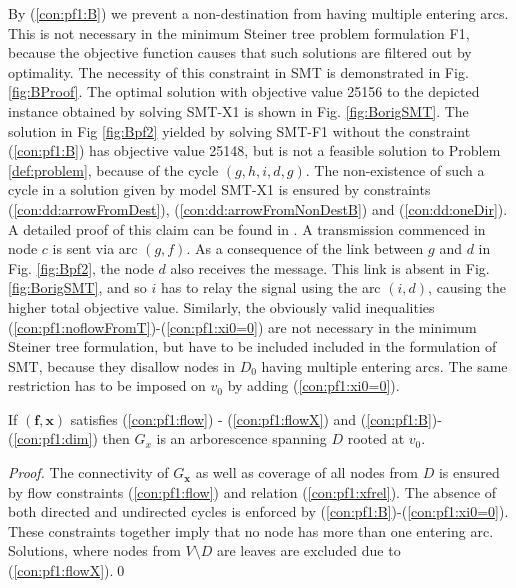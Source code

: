      By (\ref{con:pf1:B}) we prevent a non-destination from having multiple entering arcs. This is not necessary in the minimum Steiner tree problem formulation F1, because the objective function causes that such solutions are filtered out by optimality. The necessity of this constraint in SMT is demonstrated in Fig. \ref{fig:BProof}. The optimal solution with objective value 25156 to the depicted instance obtained by solving SMT-X1 is shown in Fig. \ref{fig:BorigSMT}. The solution in Fig \ref{fig:Bpf2} yielded by solving SMT-F1 without the constraint (\ref{con:pf1:B}) has objective value 25148, but is not a feasible solution to Problem \ref{def:problem}, because of the cycle $(g,h,i,d,g)$. The non-existence of such a cycle in a solution given by model SMT-X1 is ensured by constraints (\ref{con:dd:arrowFromDest}), (\ref{con:dd:arrowFromNonDestB}) and (\ref{con:dd:oneDir}). A detailed proof of this claim can be found in \cite{ivanova16isco}. A transmission commenced in node $c$ is sent via arc $(g,f)$. As a consequence of the link between $g$ and $d$ in Fig. \ref{fig:Bpf2}, the node $d$ also receives the message. This link is absent in Fig. \ref{fig:BorigSMT}, and so $i$ has to relay the signal using the arc $(i,d)$, causing the higher total objective value. Similarly, the obviously valid inequalities (\ref{con:pf1:noflowFromT})-(\ref{con:pf1:xi0=0}) are not necessary in the minimum Steiner tree formulation, but have to be included included in the formulation of SMT, because they  disallow nodes in $D_0$ having multiple entering arcs. The same restriction has to be imposed on $v_0$ by adding (\ref{con:pf1:xi0=0}).
   
\begin{prop}
\label{prop:modelcorrect}
If $(\mathbf{f},\mathbf{x})$ satisfies (\ref{con:pf1:flow}) - (\ref{con:pf1:flowX}) and (\ref{con:pf1:B})-(\ref{con:pf1:dim}) then $G_{x}$ is an arborescence spanning $D$ rooted at $v_0$.
\end{prop}
 
 \begin{proof}
 The connectivity of $G_\mathbf{x}$ as well as coverage of all nodes from $D$ is ensured by flow constraints (\ref{con:pf1:flow}) and relation (\ref{con:pf1:xfrel}). The absence of both directed and undirected cycles is enforced by (\ref{con:pf1:B})-(\ref{con:pf1:xi0=0}). These constraints together imply that no node has more than one entering arc. Solutions, where nodes from $V\setminus D$ are leaves are excluded due to (\ref{con:pf1:flowX}).\qed
 \end{proof}
 
